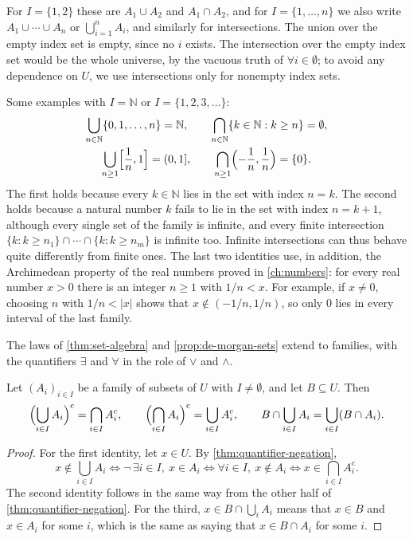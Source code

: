 For $I=\{1,2\}$ these are $A_1\cup A_2$ and $A_1\cap A_2$, and for $I=\{1,\ldots,n\}$ we also write $A_1\cup\cdots\cup A_n$ or $\bigcup_{i=1}^nA_i$, and similarly for intersections. The union over the empty index set is empty, since no $i$ exists. The intersection over the empty index set would be the whole universe, by the vacuous truth of $\forall i\in\emptyset$; to avoid any dependence on $U$, we use intersections only for nonempty index sets.

Some examples with $I=\mathbb N$ or $I=\{1,2,3,\ldots\}$:
\begin{gather*}
\bigcup_{n\in\mathbb N}\{0,1,\ldots,n\}=\mathbb N,
\qquad
\bigcap_{n\in\mathbb N}\{k\in\mathbb N: k\ge n\}=\emptyset,\\
\bigcup_{n\ge1}\Bigl[\frac1n,1\Bigr]=(0,1],
\qquad
\bigcap_{n\ge1}\Bigl(-\frac1n,\frac1n\Bigr)=\{0\}.
\end{gather*}
The first holds because every $k\in\mathbb N$ lies in the set with index $n=k$. The second holds because a natural number $k$ fails to lie in the set with index $n=k+1$, although every single set of the family is infinite, and every finite intersection $\{k: k\ge n_1\}\cap\cdots\cap\{k: k\ge n_m\}$ is infinite too. Infinite intersections can thus behave quite differently from finite ones. The last two identities use, in addition, the Archimedean property of the real numbers proved in \cref{ch:numbers}: for every real number $x>0$ there is an integer $n\ge1$ with $1/n<x$. For example, if $x\ne0$, choosing $n$ with $1/n<|x|$ shows that $x\notin(-1/n,1/n)$, so only $0$ lies in every interval of the last family.

The laws of \cref{thm:set-algebra} and \cref{prop:de-morgan-sets} extend to families, with the quantifiers $\exists$ and $\forall$ in the role of $\vee$ and $\wedge$.

\begin{proposition}
\label{prop:family-laws}
Let $(A_i)_{i\in I}$ be a family of subsets of $U$ with $I\ne\emptyset$, and let $B\subseteq U$. Then
\[
\Bigl(\bigcup_{i\in I}A_i\Bigr)^{\mathrm c}=\bigcap_{i\in I}A_i^{\mathrm c},
\qquad
\Bigl(\bigcap_{i\in I}A_i\Bigr)^{\mathrm c}=\bigcup_{i\in I}A_i^{\mathrm c},
\qquad
B\cap\bigcup_{i\in I}A_i=\bigcup_{i\in I}(B\cap A_i).
\]
\end{proposition}

\begin{proof}
For the first identity, let $x\in U$. By \cref{thm:quantifier-negation},
\[
x\notin\bigcup_{i\in I}A_i\iff\neg\,\exists i\in I,\ x\in A_i\iff\forall i\in I,\ x\notin A_i\iff x\in\bigcap_{i\in I}A_i^{\mathrm c}.
\]
The second identity follows in the same way from the other half of \cref{thm:quantifier-negation}. For the third, $x\in B\cap\bigcup_iA_i$ means that $x\in B$ and $x\in A_i$ for some $i$, which is the same as saying that $x\in B\cap A_i$ for some $i$.
\end{proof}

